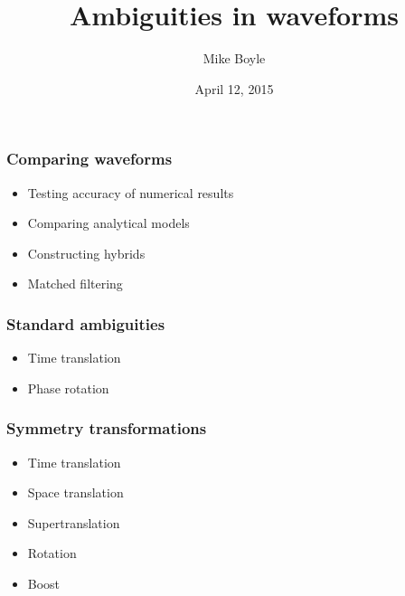 \documentclass[12pt,xcolor={dvipsnames}]{beamer}
\title{Ambiguities in waveforms}
\author[Mike Boyle] {Mike Boyle}
\institute{American Physical Society}
\date{April 12, 2015}
\begin{document}
\begin{frame}[plain]
  \titlepage
\end{frame}




\begin{frame}
  \frametitle{Comparing waveforms}
  \begin{itemize}
  \item Testing accuracy of numerical results
  \item Comparing analytical models
  \item Constructing hybrids
  \item Matched filtering
  \end{itemize}
\end{frame}

\begin{frame}
  \frametitle{Standard ambiguities}
  \begin{itemize}
  \item Time translation
  \item Phase rotation
  \end{itemize}
\end{frame}

\begin{frame}
  \frametitle{Symmetry transformations}
  \begin{itemize}
  \item Time translation
  \item Space translation
  \item Supertranslation
  \item Rotation
  \item Boost
  \end{itemize}

  \vspace{0.25in}

  \begin{center}
  \end{center}
\end{frame}
\end{document}

